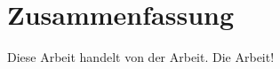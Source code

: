 \chapter*{Zusammenfassung}
\label{cap:zusammenfassung}
Diese Arbeit handelt von der Arbeit. Die Arbeit!
